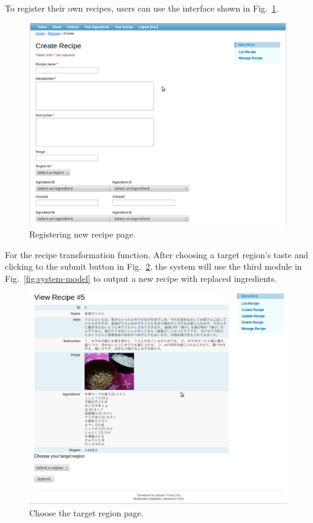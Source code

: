 To register their own recipes, users can use the interface shown in Fig.~\ref{fig:register_recipe}.
 
\begin{figure}
\centering
\includegraphics[scale=0.5]{register_recipe.eps}
\caption{Registering new recipe page.}
\label{fig:register_recipe}
\end{figure}

For the recipe transformation function. After choosing a target region's taste and clicking to the submit button in Fig.~\ref{fig:choose_target}, the system will use the third module in Fig.~\ref{fig:system-model} to output a new recipe with replaced ingredients.
 
\begin{figure}
\centering
\includegraphics[scale=0.5]{choose_target.eps}
\caption{Choose the target region page.}
\label{fig:choose_target}
\end{figure}  
